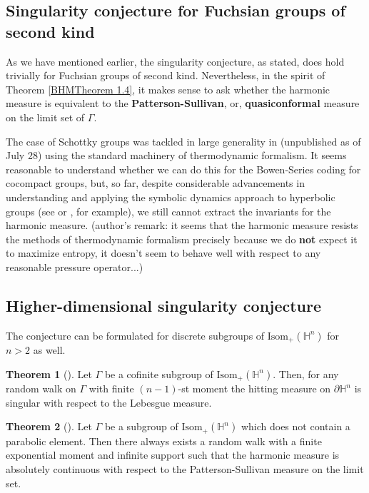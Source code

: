 \documentclass[11pt]{amsart}
\theoremstyle{definition}
\newtheorem{theorem}{Theorem}[section]
\begin{document}
	\subsection{Singularity conjecture for Fuchsian groups of second kind}
	As we have mentioned earlier, the singularity conjecture, as stated, does hold trivially for Fuchsian groups of second kind. Nevertheless, in the spirit of Theorem \ref{BHMTheorem 1.4}, it makes sense to ask whether the harmonic measure is equivalent to the \textbf{Patterson-Sullivan}, or, \textbf{quasiconformal} measure on the limit set of $\Gamma$.
	
	The case of Schottky groups was tackled in large generality in (unpublished as of July 28)\cite{garcía2023dimension} using the standard machinery of thermodynamic formalism. It seems reasonable to understand whether we can do this for the Bowen-Series coding for cocompact groups, but, so far, despite considerable advancements in understanding and applying the symbolic dynamics approach to hyperbolic groups (see \cite{ASENS_2013_4_46_1_131_0} or \cite{cantrell2022invariant}, for example), we still cannot extract the invariants for the harmonic measure. (author's remark: it seems that the harmonic measure resists the methods of thermodynamic formalism precisely because we do \textbf{not} expect it to maximize entropy, it doesn't seem to behave well with respect to any reasonable pressure operator...)
	
	\subsection{Higher-dimensional singularity conjecture}
	The conjecture can be formulated for discrete subgroups of $\text{Isom}_+(\mathbb{H}^n)$ for $n > 2$ as well. 
	
	\begin{theorem}[\cite{2019arXiv190411581R}]
		Let $\Gamma$ be a cofinite subgroup of $\text{Isom}_+(\mathbb{H}^n)$. Then, for any random walk on $\Gamma$ with finite $(n-1)$-st moment the hitting measure on $\partial \mathbb{H}^n$ is singular with respect to the Lebesgue measure.
	\end{theorem}
	\begin{theorem}[\cite{linaudpan}]
		Let $\Gamma$ be a subgroup of $\text{Isom}_+(\mathbb{H}^n)$ which does not contain a parabolic element. Then there always exists a random walk with a finite exponential moment and infinite support such that the harmonic measure is absolutely continuous with respect to the Patterson-Sullivan measure on the limit set.
	\end{theorem}
	
\end{document}
